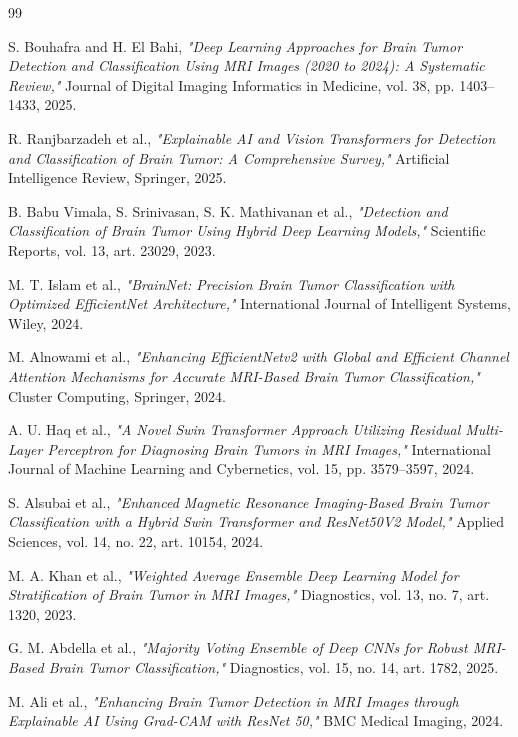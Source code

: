 \documentclass[12pt,a4paper,oneside]{report}
\begin{document}
\begin{thebibliography}{99}

S. Bouhafra and H. El Bahi,
\textit{"Deep Learning Approaches for Brain Tumor Detection and
Classification Using MRI Images (2020 to 2024): A Systematic Review,"}
Journal of Digital Imaging Informatics in Medicine,
vol. 38, pp. 1403--1433, 2025.

R. Ranjbarzadeh et al.,
\textit{"Explainable AI and Vision Transformers for Detection and
Classification of Brain Tumor: A Comprehensive Survey,"}
Artificial Intelligence Review, Springer, 2025.

B. Babu Vimala, S. Srinivasan, S. K. Mathivanan et al.,
\textit{"Detection and Classification of Brain Tumor Using Hybrid Deep
Learning Models,"}
Scientific Reports, vol. 13, art. 23029, 2023.

M. T. Islam et al.,
\textit{"BrainNet: Precision Brain Tumor Classification with Optimized
EfficientNet Architecture,"}
International Journal of Intelligent Systems, Wiley, 2024.

M. Alnowami et al.,
\textit{"Enhancing EfficientNetv2 with Global and Efficient Channel
Attention Mechanisms for Accurate MRI-Based Brain Tumor Classification,"}
Cluster Computing, Springer, 2024.

A. U. Haq et al.,
\textit{"A Novel Swin Transformer Approach Utilizing Residual Multi-Layer
Perceptron for Diagnosing Brain Tumors in MRI Images,"}
International Journal of Machine Learning and Cybernetics,
vol. 15, pp. 3579--3597, 2024.

S. Alsubai et al.,
\textit{"Enhanced Magnetic Resonance Imaging-Based Brain Tumor
Classification with a Hybrid Swin Transformer and ResNet50V2 Model,"}
Applied Sciences, vol. 14, no. 22, art. 10154, 2024.

M. A. Khan et al.,
\textit{"Weighted Average Ensemble Deep Learning Model for Stratification
of Brain Tumor in MRI Images,"}
Diagnostics, vol. 13, no. 7, art. 1320, 2023.

G. M. Abdella et al.,
\textit{"Majority Voting Ensemble of Deep CNNs for Robust MRI-Based Brain
Tumor Classification,"}
Diagnostics, vol. 15, no. 14, art. 1782, 2025.

M. Ali et al.,
\textit{"Enhancing Brain Tumor Detection in MRI Images through Explainable
AI Using Grad-CAM with ResNet 50,"}
BMC Medical Imaging, 2024.


\end{thebibliography}
\end{document}
